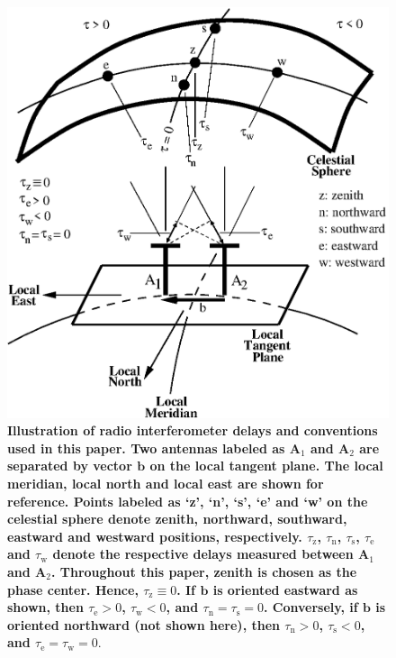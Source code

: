 \documentclass[preprint2,iop,numberedappendix,twocolappendix,appendixfloats]{emulateapj}
\begin{document}
\begin{figure}[htb]
\centering
\includegraphics[width=\linewidth]{figureA1.eps}
\caption{{\bf Illustration of radio interferometer delays and conventions used in this paper. Two antennas labeled as A$_1$ and A$_2$ are separated by vector $\boldsymbol{b}$ on the local tangent plane. The local meridian, local north and local east are shown for reference. Points labeled as `z', `n', `s', `e' and `w' on the celestial sphere denote zenith, northward, southward, eastward and westward positions, respectively. $\tau_\textrm{z}$, $\tau_\textrm{n}$, $\tau_\textrm{s}$, $\tau_\textrm{e}$ and $\tau_\textrm{w}$ denote the respective delays measured between A$_1$ and A$_2$. Throughout this paper, zenith is chosen as the phase center. Hence, $\tau_\textrm{z}\equiv 0$. If $\boldsymbol{b}$ is oriented eastward as shown, then $\tau_\textrm{e} > 0$, $\tau_\textrm{w} < 0$, and $\tau_\textrm{n}=\tau_\textrm{s}=0$. Conversely, if $\boldsymbol{b}$ is oriented northward (not shown here), then $\tau_\textrm{n} > 0$, $\tau_\textrm{s} < 0$, and $\tau_\textrm{e}=\tau_\textrm{w}=0$}. \label{fig:delay-cartoon}}
\end{figure}
\end{document}
